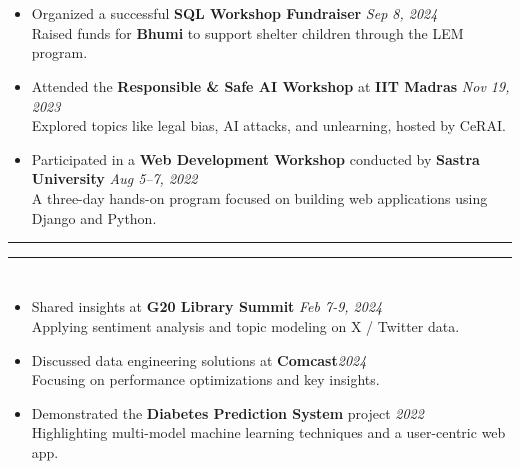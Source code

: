 \documentclass[a4paper,10pt]{article}
\begin{document}
\section{\scshape\color{Fuchsia}{\faBookOpen \ \textbf WORKSHOPS}}
\begin{itemize}
    \item Organized a successful \textbf{SQL Workshop Fundraiser} \href{https://www.linkedin.com/posts/a-shreehari_fundraiser-sqlworkshop-communitysupport-activity-7239111496339746816-VhVM?utm_source=share&utm_medium=member_desktop}{} \hfill \textit{Sep 8, 2024}\\ Raised funds for \textbf{Bhumi} to support shelter children through the LEM program.
    \vspace{-2mm}
    \item Attended the \textbf{Responsible \& Safe AI Workshop} at \textbf{IIT Madras} \href{https://www.linkedin.com/posts/activity-7132008217424916480-G6g2?utm_source=share&utm_medium=member_desktop}{} \hfill \textit{Nov 19, 2023} \\ 
    Explored topics like legal bias, AI attacks, and unlearning, hosted by CeRAI.
    \vspace{-2mm}
    \item Participated in a \textbf{Web Development Workshop} conducted by \textbf{Sastra University} \hfill \textit{Aug 5–7, 2022} \\
    A three-day hands-on program focused on building web applications using Django and Python.
\end{itemize}

\hrule
\hrule
\section{\scshape\color{Fuchsia}{\faChalkboardTeacher\ \textbf PRESENTATIONS}}
\begin{itemize}
    \item Shared insights at \textbf{G20 Library Summit} \href{https://www.linkedin.com/posts/a-shreehari_g20librarysummit-useremotions-technologyintegration-activity-7163759412841529344-ii6j?utm_source=share&utm_medium=member_desktop}{} \hfill \textit{Feb 7-9, 2024}\\
    Applying sentiment analysis and topic modeling on X / Twitter data.  
    \vspace{-2mm}
    \item Discussed data engineering solutions at \textbf{Comcast}\hfill \textit{2024}\\
    Focusing on performance optimizations and key insights.
    \vspace{-2mm}
    \item Demonstrated the \textbf{Diabetes Prediction System} project \hfill \textit{2022}\\
    Highlighting multi-model machine learning techniques and a user-centric web app. 
\end{itemize}
\end{document}
